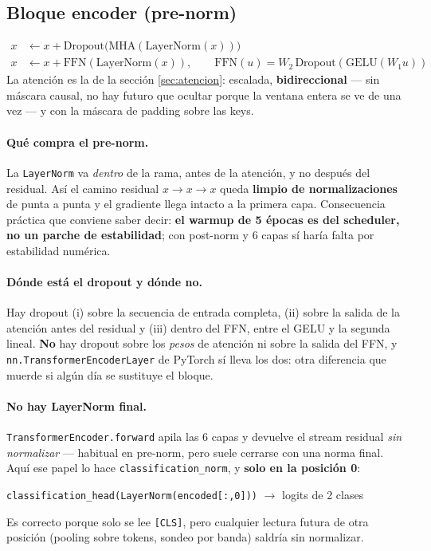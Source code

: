 \documentclass[11pt,a4paper]{article}
\newcommand{\code}[1]{\texttt{\small #1}}
\begin{document}
\subsection{Bloque encoder (pre-norm)}
\label{sec:encoder}
\begin{align}
x &\leftarrow x + \mathrm{Dropout}\bigl(\mathrm{MHA}(\mathrm{LayerNorm}(x))\bigr) \\
x &\leftarrow x + \mathrm{FFN}(\mathrm{LayerNorm}(x)), \qquad
\mathrm{FFN}(u) = W_2\,\mathrm{Dropout}(\mathrm{GELU}(W_1 u))
\end{align}
La atención es la de la sección \ref{sec:atencion}: escalada, \textbf{bidireccional} --- sin máscara
causal, no hay futuro que ocultar porque la ventana entera se ve de una vez --- y con la máscara de
padding sobre las keys.

\paragraph{Qué compra el pre-norm.} La \code{LayerNorm} va \emph{dentro} de la rama, antes de la
atención, y no después del residual. Así el camino residual $x\to x\to x$ queda \textbf{limpio de
normalizaciones} de punta a punta y el gradiente llega intacto a la primera capa. Consecuencia
práctica que conviene saber decir: \textbf{el warmup de 5 épocas es del scheduler, no un parche de
estabilidad}; con post-norm y 6 capas sí haría falta por estabilidad numérica.

\paragraph{Dónde está el dropout y dónde no.} Hay dropout (i) sobre la secuencia de entrada completa,
(ii) sobre la salida de la atención antes del residual y (iii) dentro del FFN, entre el GELU y la
segunda lineal. \textbf{No} hay dropout sobre los \emph{pesos} de atención ni sobre la salida del
FFN, y \code{nn.TransformerEncoderLayer} de PyTorch sí lleva los dos: otra diferencia que muerde si
algún día se sustituye el bloque.

\paragraph{No hay LayerNorm final.} \code{TransformerEncoder.forward} apila las 6 capas y devuelve el
stream residual \emph{sin normalizar} --- habitual en pre-norm, pero suele cerrarse con una norma
final. Aquí ese papel lo hace \code{classification\_norm}, y \textbf{solo en la posición 0}:
\begin{center}
\code{classification\_head(LayerNorm(encoded[:,0]))} $\longrightarrow$ logits de 2 clases
\end{center}
Es correcto porque solo se lee \code{[CLS]}, pero cualquier lectura futura de otra posición (pooling
sobre tokens, sondeo por banda) saldría sin normalizar.
\end{document}
